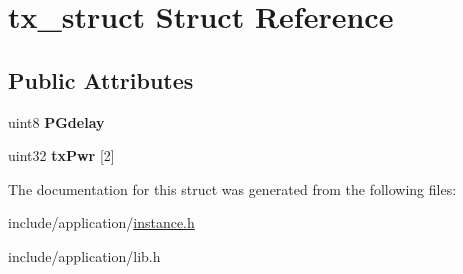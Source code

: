 \hypertarget{structtx__struct}{\section{tx\-\_\-struct Struct Reference}
\label{structtx__struct}
}
\subsection*{Public Attributes}
\begin{DoxyCompactItemize}
\item 
\hypertarget{structtx__struct_a04ddc4cbc9592fcd0c787e854622a4bc}{uint8 {\bfseries P\-Gdelay}}\label{structtx__struct_a04ddc4cbc9592fcd0c787e854622a4bc}

\item 
\hypertarget{structtx__struct_a396d48a6f841de3d7c27052613553c86}{uint32 {\bfseries tx\-Pwr} \mbox{[}2\mbox{]}}\label{structtx__struct_a396d48a6f841de3d7c27052613553c86}

\end{DoxyCompactItemize}


The documentation for this struct was generated from the following files\-:\begin{DoxyCompactItemize}
\item 
include/application/\hyperlink{instance_8h}{instance.\-h}\item 
include/application/lib.\-h\end{DoxyCompactItemize}
